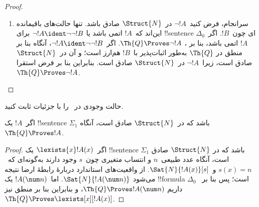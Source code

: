 \documentclass[../../../include/open-logic-section]{subfiles}
\begin{document}
\begin{proof}
\begin{enumerate}
$\Th{Q}$ با~$\bforall{x<t}{\lnot!A(x)}$ هم‌ارز است؛ پس می‌توانیم
استدلال مربوط به سورهای کلی کراندار را به کار بریم.
%
\item سرانجام، فرض کنید~$\lnot !A$ در~$\Struct{N}$ صادق باشد. تنها
حالت‌های باقیمانده این‌اند که~$!A$ اتمی باشد یا
$\lnot !A \ident \lnot\lnot !B$ برای !!{sentence}
$\Delta_0$ای چون~$!B$. اگر~$!A$ اتمی باشد، بنا بر
، $\Th{Q} \Proves \lnot !A$.
اگر~$\lnot !A \ident \lnot\lnot !B$، آنگاه بنا بر منطق در
$\Th{Q}$ به‌طور اثبات‌پذیر با~$!B$ هم‌ارز است؛ و آن در~$\Struct{N}$
صادق است، زیرا~$\lnot !A$ در~$\Struct{N}$ صادق است. بنابراین
بنا بر فرض استقرا~$\Th{Q} \Proves \lnot !A$.
\end{enumerate}
\end{proof}

\begin{prob}
حالت وجودی در~ را با جزئیات ثابت کنید.
\end{prob}

\begin{thm}
اگر~$!A$ یک !!{sentence} $\Sigma_1$ باشد که در~$\Struct{N}$ صادق است،
آنگاه~$\Th{Q} \Proves !A$.
\end{thm}

\begin{proof}
اگر~$\lexists{x}!A(x)$ یک !!{sentence} $\Sigma_1$ باشد که در
$\Struct{N}$ صادق است، آنگاه عدد طبیعی~$n$ و انتساب متغیری چون~$s$
وجود دارند به‌گونه‌ای که~$s(x) = n$ و~$\Sat{N}{!A(x)}[s]$.
از واقعیت‌های استاندارد دربارهٔ رابطهٔ ارضا نتیجه می‌شود
$\Sat{N}{!A(\num n)}$. اما~$!A(\num n)$ یک !!{formula} $\Delta_0$
است؛ پس بنا بر~ داریم
$\Th{Q} \Proves !A(\num n)$، و بنابراین بنا بر منطق نیز
$\Th{Q} \Proves \lexists[x][!A(x)]$.
\end{proof}
\end{document}
